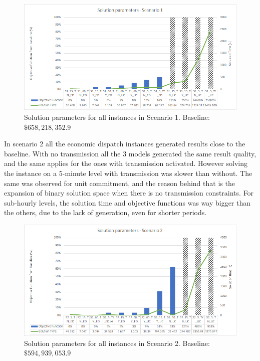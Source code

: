 \documentclass[12pt,LUDisStyle,twosided]{book}
\begin{document}
\begin{figure}[h] 
  \centering
  
	  \includegraphics[width=\textwidth,height=\textheight,keepaspectratio]{SolutionParametersS1.png}
  
  \caption{Solution parameters for all instances in Scenario 1. Baseline: $\$658,218,352.9$}
  \label{fig:solutionparameterss1}
\end{figure}

In scenario 2 all the economic dispatch instances generated results close to the baseline. With no transmission all the 3 models generated the same result quality, and the same applies for the ones with transmission activated. However solving the instance on a 5-minute level with transmission was slower than without. The same was observed for unit commitment, and the reason behind that is the expansion of binary solution space when there is no transmission constraints. For sub-hourly levels, the solution time and objective functions was way bigger than the others, due to the lack of generation, even for shorter periods.

\begin{figure}[h] 
  \centering
  
	  \includegraphics[width=\textwidth,height=\textheight,keepaspectratio]{SolutionParametersS2.png}
  
  \caption{Solution parameters for all instances in Scenario 2. Baseline: $\$594,939,053.9$}
  \label{fig:solutionparameterss2}
\end{figure}
\end{document}
